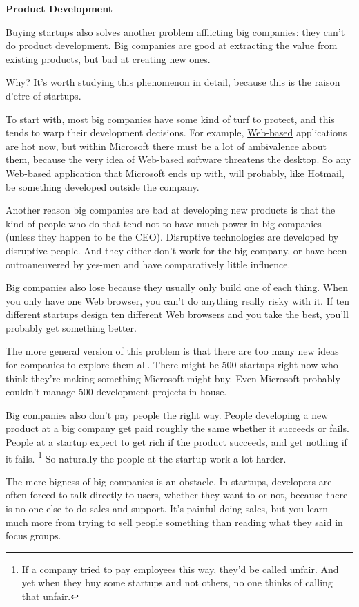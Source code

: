 \documentclass[12pt]{book}
\begin{document}
\textbf{Product Development}

Buying startups also solves another problem afflicting big companies:
they can't do product development. Big companies are good at extracting
the value from existing products, but bad at creating new ones.

Why? It's worth studying this phenomenon in detail, because this is the
raison d'etre of startups.

To start with, most big companies have some kind of turf to protect, and
this tends to warp their development decisions. For example,
\href{road.html}{Web-based} applications are hot now, but within
Microsoft there must be a lot of ambivalence about them, because the
very idea of Web-based software threatens the desktop. So any Web-based
application that Microsoft ends up with, will probably, like Hotmail, be
something developed outside the company.

Another reason big companies are bad at developing new products is that
the kind of people who do that tend not to have much power in big
companies (unless they happen to be the CEO). Disruptive technologies
are developed by disruptive people. And they either don't work for the
big company, or have been outmaneuvered by yes-men and have
comparatively little influence.

Big companies also lose because they usually only build one of each
thing. When you only have one Web browser, you can't do anything really
risky with it. If ten different startups design ten different Web
browsers and you take the best, you'll probably get something better.

The more general version of this problem is that there are too many new
ideas for companies to explore them all. There might be 500 startups
right now who think they're making something Microsoft might buy. Even
Microsoft probably couldn't manage 500 development projects in-house.

Big companies also don't pay people the right way. People developing a
new product at a big company get paid roughly the same whether it
succeeds or fails. People at a startup expect to get rich if the product
succeeds, and get nothing if it fails. \footnote{If a company tried to pay employees this way, they'd be called
unfair. And yet when they buy some startups and not others, no one
thinks of calling that unfair.} So
naturally the people at the startup work a lot harder.

The mere bigness of big companies is an obstacle. In startups,
developers are often forced to talk directly to users, whether they want
to or not, because there is no one else to do sales and support. It's
painful doing sales, but you learn much more from trying to sell people
something than reading what they said in focus groups.
\end{document}
